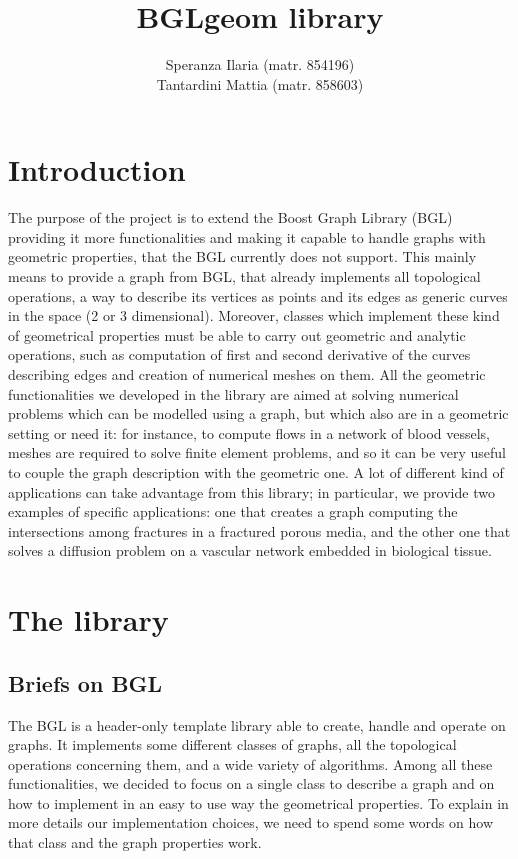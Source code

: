 \documentclass[10pt]{article} %
\title{BGLgeom library}
\author{Speranza Ilaria (matr. 854196) \\ Tantardini Mattia (matr. 858603)}
\begin{document}
	\maketitle
	\newpage
	\tableofcontents
	\newpage
	
	\section{Introduction}
	The purpose of the project is to extend the Boost Graph Library (BGL) providing it more functionalities and making it capable to handle graphs with geometric properties, that the BGL currently does not support. This mainly means to provide a graph from BGL, that already implements all topological operations, a way to describe its vertices as points and its edges as generic curves in the space (2 or 3 dimensional). Moreover, classes which implement these kind of geometrical properties must be able to carry out geometric and analytic operations, such as computation of first and second derivative of the curves describing edges and creation of numerical meshes on them. \newline
	All the geometric functionalities we developed in the library are aimed at solving numerical problems which can be modelled using a graph, but which also are in a geometric setting or need it: for instance, to compute flows in a network of blood vessels, meshes are required to solve finite element problems, and so it can be very useful to couple the graph description with the geometric one. \newline
	A lot of different kind of applications can take advantage from this library; in particular, we provide two examples of specific applications: one that creates a graph computing the intersections among fractures in a fractured porous media, and the other one that solves a diffusion problem on a vascular network embedded in biological tissue.
	
	\section{The library}
	\subsection{Briefs on BGL}
	The BGL is a header-only template library able to create, handle and operate on graphs. It implements some different classes of graphs, all the topological operations concerning them, and a wide variety of algorithms.
	\newline\newline
	Among all these functionalities, we decided to focus on a single class to describe a graph and on how to implement in an easy to use way the geometrical properties. To explain in more details our implementation choices, we need to spend some words on how that class and the graph properties work.
	
\end{document}
